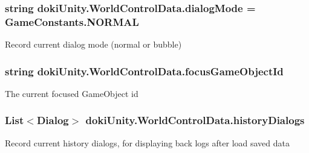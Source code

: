 \subsubsection[{\texorpdfstring{dialog\+Mode}{dialogMode}}]{\setlength{\rightskip}{0pt plus 5cm}string doki\+Unity.\+World\+Control\+Data.\+dialog\+Mode = Game\+Constants.\+N\+O\+R\+M\+AL}\hypertarget{classdoki_unity_1_1_world_control_data_ab53a46142e7f6a0755e45a9a8207722e}{}\label{classdoki_unity_1_1_world_control_data_ab53a46142e7f6a0755e45a9a8207722e}


Record current dialog mode (normal or bubble) 

\subsubsection[{\texorpdfstring{focus\+Game\+Object\+Id}{focusGameObjectId}}]{\setlength{\rightskip}{0pt plus 5cm}string doki\+Unity.\+World\+Control\+Data.\+focus\+Game\+Object\+Id}\hypertarget{classdoki_unity_1_1_world_control_data_a0319725497feb339c9454a9558944a4a}{}\label{classdoki_unity_1_1_world_control_data_a0319725497feb339c9454a9558944a4a}


The current focused Game\+Object id 

\subsubsection[{\texorpdfstring{history\+Dialogs}{historyDialogs}}]{\setlength{\rightskip}{0pt plus 5cm}List$<${\bf Dialog}$>$ doki\+Unity.\+World\+Control\+Data.\+history\+Dialogs}\hypertarget{classdoki_unity_1_1_world_control_data_ac7a3b1ed4fb548aca66bc6b2693b772c}{}\label{classdoki_unity_1_1_world_control_data_ac7a3b1ed4fb548aca66bc6b2693b772c}


Record current history dialogs, for displaying back logs after load saved data 

